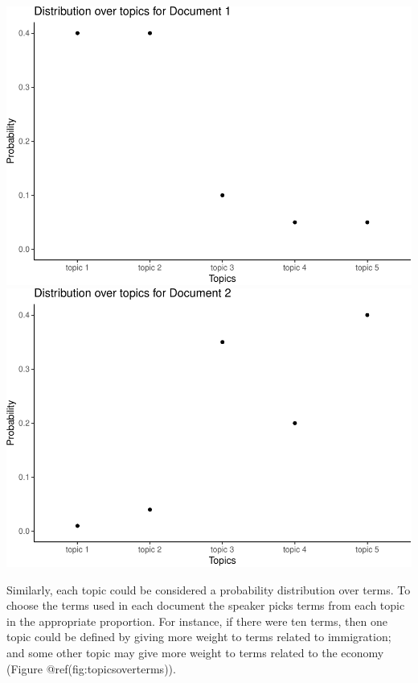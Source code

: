 \documentclass[12pt,]{article}
\begin{document}
\includegraphics{svm-rmarkdown-article-example_files/figure-latex/topicsoverdocuments-1.pdf}
\includegraphics{svm-rmarkdown-article-example_files/figure-latex/topicsoverdocuments-2.pdf}

Similarly, each topic could be considered a probability distribution
over terms. To choose the terms used in each document the speaker picks
terms from each topic in the appropriate proportion. For instance, if
there were ten terms, then one topic could be defined by giving more
weight to terms related to immigration; and some other topic may give
more weight to terms related to the economy (Figure
@ref(fig:topicsoverterms)).
\end{document}
